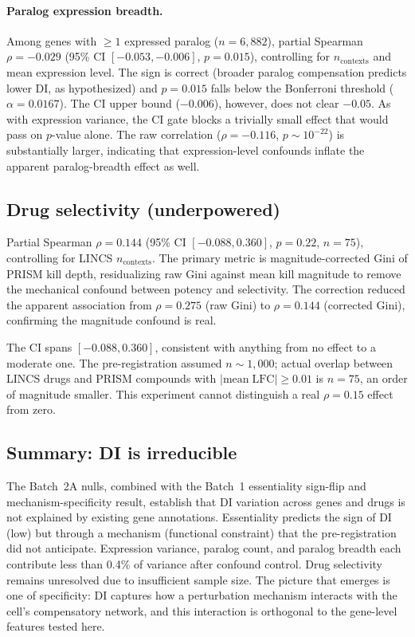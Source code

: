 \documentclass[11pt]{article}
\begin{document}
\paragraph{Paralog expression breadth.}
Among genes with $\geq 1$ expressed paralog ($n = 6{,}882$), partial
Spearman $\rho = -0.029$ (95\% CI $[-0.053, -0.006]$, $p = 0.015$),
controlling for $n_{\mathrm{contexts}}$ and mean expression level.  The
sign is correct (broader paralog compensation predicts lower DI, as
hypothesized) and $p = 0.015$ falls below the Bonferroni threshold
($\alpha = 0.0167$).  The CI upper bound ($-0.006$), however, does not
clear $-0.05$.  As with expression variance, the CI gate blocks a trivially small effect
that would pass on $p$-value alone.  The raw correlation
($\rho = -0.116$, $p \sim 10^{-22}$) is substantially larger,
indicating that expression-level confounds inflate the apparent
paralog-breadth effect as well.


\subsection{Drug selectivity (underpowered)}

Partial Spearman $\rho = 0.144$ (95\% CI $[-0.088, 0.360]$,
$p = 0.22$, $n = 75$), controlling for LINCS $n_{\mathrm{contexts}}$.
The primary metric is magnitude-corrected Gini of PRISM kill depth,
residualizing raw Gini against mean kill magnitude to remove the
mechanical confound between potency and selectivity.  The correction
reduced the apparent association from $\rho = 0.275$ (raw Gini) to
$\rho = 0.144$ (corrected Gini), confirming the magnitude confound is
real.

The CI spans $[-0.088, 0.360]$, consistent with anything from no effect
to a moderate one.  The pre-registration assumed $n \sim 1{,}000$;
actual overlap between LINCS drugs and PRISM compounds with
$|\mathrm{mean\;LFC}| \geq 0.01$ is $n = 75$, an order of magnitude
smaller.  This experiment cannot distinguish a real $\rho = 0.15$ effect
from zero.


\subsection{Summary: DI is irreducible}

The Batch~2A nulls, combined with the Batch~1 essentiality sign-flip
and mechanism-specificity result, establish that DI variation across
genes and drugs is not explained by existing gene annotations.
Essentiality predicts the sign of DI (low) but through a mechanism
(functional constraint) that the pre-registration did not anticipate.
Expression variance, paralog count, and paralog breadth each contribute
less than 0.4\% of variance after confound control.  Drug selectivity
remains unresolved due to insufficient sample size.  The picture that
emerges is one of specificity: DI captures how a perturbation mechanism
interacts with the cell's compensatory network, and this interaction is
orthogonal to the gene-level features tested here.
\end{document}
